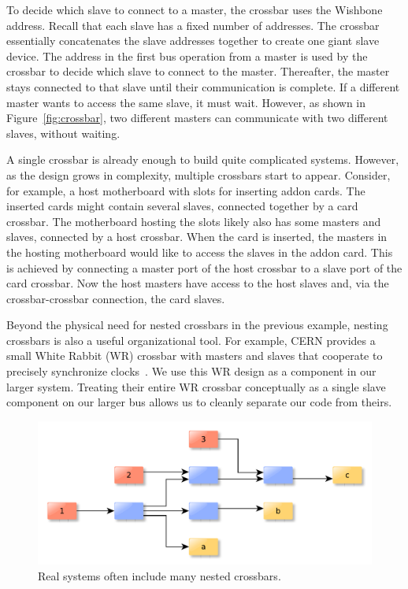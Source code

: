 \documentclass[a4paper]{jacow}
\begin{document}
To decide which slave to connect to a master, the crossbar uses the Wishbone address.
Recall that each slave has a fixed number of addresses.
The crossbar essentially concatenates the slave addresses together to create
one giant slave device.
The address in the first bus operation from a master is used by the crossbar
to decide which slave to connect to the master.
Thereafter, the master stays connected to that slave until their
communication is complete.
If a different master wants to access the same slave, it must wait.
However, as shown in Figure~\ref{fig:crossbar}, two different masters can
communicate with two different slaves, without waiting.

A single crossbar is already enough to build quite complicated systems.
However, as the design grows in complexity, multiple crossbars start to appear.
Consider, for example, a host motherboard with slots for inserting addon cards.
The inserted cards might contain several slaves, connected together by a card crossbar.
The motherboard hosting the slots likely also has some masters and slaves, 
connected by a host crossbar.
When the card is inserted, the masters in the hosting motherboard 
would like to access the slaves in the addon card.
This is achieved by connecting a master port of the host crossbar 
to a slave port of the card crossbar.
Now the host masters have access to the host slaves and, via the
crossbar-crossbar connection, the card slaves.

Beyond the physical need for nested crossbars in the previous example,
nesting crossbars is also a useful organizational tool.
For example, CERN provides a small White Rabbit (WR) crossbar with masters
and slaves that cooperate to precisely synchronize clocks~\cite{wr}.
We use this WR design as a component in our larger system.
Treating their entire WR crossbar conceptually as a single slave component on
our larger bus allows us to cleanly separate our code from theirs.

\begin{figure}[t]
  \centering
  \includegraphics*[width=\columnwidth]{complex-bus}
  \caption{Real systems often include many nested crossbars.}
  \label{fig:complex-bus}
\end{figure}
\end{document}
